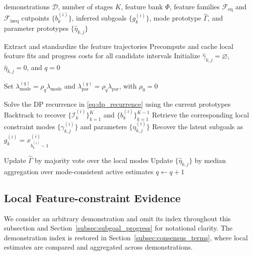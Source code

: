 \documentclass[lettersize,journal]{IEEEtran}
\begin{document}
\begin{algorithm}[t]
\caption{Stage-wise Constraint Learning from Demonstrations}
\label{alg:swcl}
\begin{algorithmic}[1]
\Require demonstrations $\mathcal{D}$, number of stages $K$,
feature bank $\Phi$, feature families
$\mathcal{F}_{\mathrm{eq}}$ and $\mathcal{F}_{\mathrm{ineq}}$
\Ensure cutpoints $\{b_k^{(i)}\}$, inferred subgoals
$\{g_k^{(i)}\}$, mode prototype $\hat{\Gamma}$,
and parameter prototypes $\{\hat{\eta}_{k,j}\}$

\State Extract and standardize the feature trajectories
\State Precompute and cache local feature fits and progress costs for all candidate intervals
\State Initialize $\hat{\gamma}_{k,j}=\varnothing$,
$\hat{\eta}_{k,j}=0$, and $q=0$

\Repeat
    \State Set
    $\lambda_{\mathrm{mode}}^{(q)}
    =\rho_q\lambda_{\mathrm{mode}}$
    and
    $\lambda_{\mathrm{par}}^{(q)}
    =\rho_q\lambda_{\mathrm{par}}$,
    with $\rho_0=0$

        \State Solve the DP recurrence in \eqref{eq:dp_recurrence} using the current prototypes
        \State Backtrack to recover
        $\{\mathcal{I}_k^{(i)}\}_{k=1}^{K}$
        and $\{b_k^{(i)}\}_{k=1}^{K-1}$
        \State Retrieve the corresponding local constraint modes
        $\{\gamma_{k,j}^{(i)}\}$ and parameters $\{\eta_{k,j}^{(i)}\}$
        \State Recover the latent subgoals as
        $g_k^{(i)}=x_{b_k^{(i)}-1}^{(i)}$
    \EndFor

    \State Update $\hat{\Gamma}$ by majority vote over the local modes
    \State Update $\{\hat{\eta}_{k,j}\}$ by median aggregation over mode-consistent active estimates
    \State $q\leftarrow q+1$
\end{algorithmic}
\end{algorithm}


\subsection{Local Feature-constraint Evidence}
\label{subsec:local_constraint_evidence}

We consider an arbitrary demonstration and omit its index throughout this subsection and Section~\ref{subsec:subgoal_progress} for notational clarity. The demonstration index is restored in Section~\ref{subsec:consensus_terms}, where local estimates are compared and aggregated across demonstrations.
\end{document}
